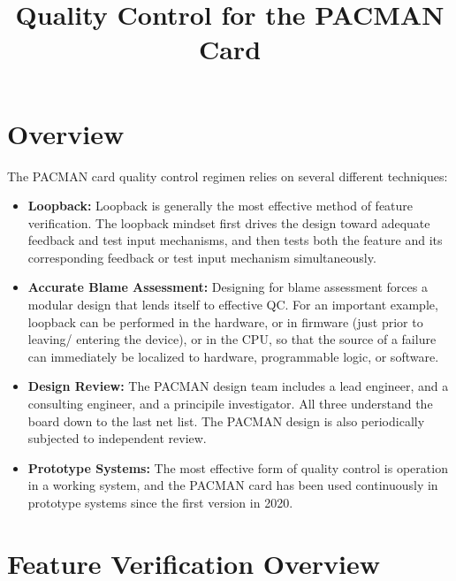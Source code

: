 \documentclass[12pt]{article}
\begin{document}


\title{Quality Control for the PACMAN Card}

\maketitle

\section{Overview}

The PACMAN card quality control regimen relies on several different techniques:
\begin{itemize}

\item {\bf Loopback:} Loopback is generally the most effective method
  of feature verification.  The loopback mindset first drives the
  design toward adequate feedback and test input mechanisms, and then
  tests both the feature and its corresponding feedback or test input
  mechanism simultaneously.

\item {\bf Accurate Blame Assessment:} Designing for blame assessment
  forces a modular design that lends itself to effective QC.  For an
  important example, loopback can be performed in the hardware, or in
  firmware (just prior to leaving/ entering the device), or in the
  CPU, so that the source of a failure can immediately be localized to
  hardware, programmable logic, or software.

\item {\bf Design Review:} The PACMAN design team includes a lead
  engineer, and a consulting engineer, and a principile investigator.
  All three understand the board down to the last net list.  The
  PACMAN design is also periodically subjected to independent review.
  
\item {\bf Prototype Systems:} The most effective form of quality
  control is operation in a working system, and the PACMAN card has
  been used continuously in prototype systems since the first version
  in 2020.

\end{itemize}

\section{Feature Verification Overview}
\end{document}
